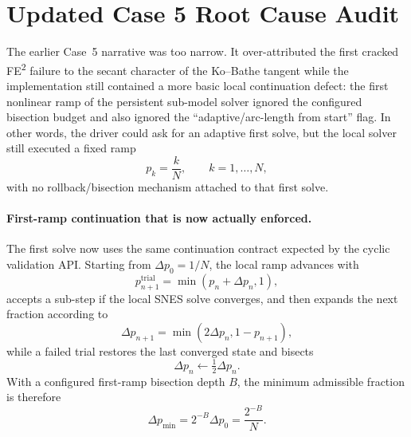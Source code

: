 \section{Updated Case 5 Root Cause Audit}
\label{sec:case5-updated-root-cause}

The earlier Case~5 narrative was too narrow.  It over-attributed the first
cracked FE\textsuperscript{2} failure to the secant character of the
Ko--Bathe tangent while the implementation still contained a more basic local
continuation defect: the first nonlinear ramp of the persistent sub-model
solver ignored the configured bisection budget and also ignored the
``adaptive/arc-length from start'' flag.  In other words, the driver could ask
for an adaptive first solve, but the local solver still executed a fixed ramp
\begin{equation}
  p_k = \frac{k}{N}, \qquad k=1,\dots,N,
\end{equation}
with no rollback/bisection mechanism attached to that first solve.

\paragraph{First-ramp continuation that is now actually enforced.}
The first solve now uses the same continuation contract expected by the cyclic
validation API.  Starting from \(\Delta p_0 = 1/N\), the local ramp advances
with
\begin{equation}
  p_{n+1}^{\mathrm{trial}} = \min(p_n + \Delta p_n, 1),
\end{equation}
accepts a sub-step if the local SNES solve converges, and then expands the
next fraction according to
\begin{equation}
  \Delta p_{n+1} = \min(2 \Delta p_n, 1 - p_{n+1}),
\end{equation}
while a failed trial restores the last converged state and bisects
\begin{equation}
  \Delta p_n \leftarrow \tfrac{1}{2}\Delta p_n.
\end{equation}
With a configured first-ramp bisection depth \(B\), the minimum admissible
fraction is therefore
\begin{equation}
  \Delta p_{\min} = 2^{-B}\Delta p_0 = \frac{2^{-B}}{N}.
  \label{eq:first-ramp-min-frac}
\end{equation}


